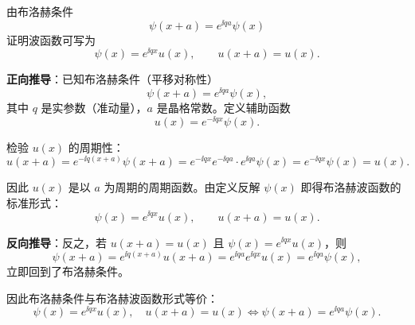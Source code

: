 \begin{question}
由布洛赫条件
\[
\psi(x+a)=e^{\ii qa}\psi(x)
\]
证明波函数可写为
\[
\psi(x)=e^{\ii qx}u(x),\qquad u(x+a)=u(x).
\]
\end{question}
\begin{solution}
	\textbf{正向推导}：已知布洛赫条件（平移对称性）
	\[
	\psi(x+a)=e^{\ii qa}\psi(x),
	\]
	其中 $q$ 是实参数（准动量），$a$ 是晶格常数。定义辅助函数
	\[
	u(x)=e^{-\ii qx}\psi(x).
	\]

	检验 $u(x)$ 的周期性：
	\[
	u(x+a)=e^{-\ii q(x+a)}\psi(x+a)
	=e^{-\ii qx}e^{-\ii qa}\cdot e^{\ii qa}\psi(x)
	=e^{-\ii qx}\psi(x)=u(x).
	\]

	因此 $u(x)$ 是以 $a$ 为周期的周期函数。由定义反解 $\psi(x)$ 即得布洛赫波函数的标准形式：
	\[
	\psi(x)=e^{\ii qx}u(x),\qquad u(x+a)=u(x).
	\]

	\textbf{反向推导}：反之，若 $u(x+a)=u(x)$ 且 $\psi(x)=e^{\ii qx}u(x)$，则
	\[
	\psi(x+a)=e^{\ii q(x+a)}u(x+a)=e^{\ii qa}e^{\ii qx}u(x)=e^{\ii qa}\psi(x),
	\]
	立即回到了布洛赫条件。

	因此布洛赫条件与布洛赫波函数形式等价：
	\[
	\boxed{\psi(x)=e^{\ii qx}u(x),\quad u(x+a)=u(x)
	\Longleftrightarrow \psi(x+a)=e^{\ii qa}\psi(x)}.
	\]
	\end{solution}

